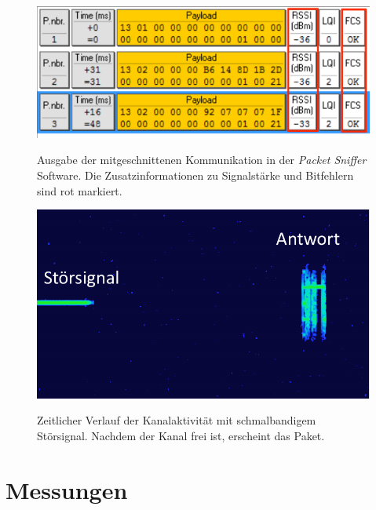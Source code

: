 \begin{figure}[bth]
        \myfloatalign
        {\includegraphics[width=0.8\linewidth]{gfx/ScS_Sniffer_AP_2Boxen_Vers_001_markiert}} 
        \caption[Sniffer]{Ausgabe der mitgeschnittenen Kommunikation in der \emph{Packet Sniffer} Software. Die Zusatzinformationen zu Signalstärke und Bitfehlern sind rot markiert.}\label{fig:sniffer}
\end{figure}

\begin{figure}[bth]
        \myfloatalign
        {\includegraphics[width=0.6\linewidth]{gfx/Stoerer_Spac}} 
        \caption[Störsender]{Zeitlicher Verlauf der Kanalaktivität mit schmalbandigem Störsignal. Nachdem der Kanal frei ist, erscheint das Paket.}\label{fig:spac_stoerer}
\end{figure}

\section{Messungen}

